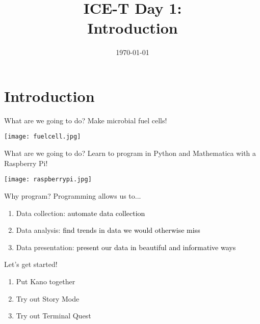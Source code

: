 \documentclass[xcolor=x11names,compress]{beamer}
\title[{\makebox[.5\paperwidth]{General Chemistry Recitation 1\hfill
       \insertframenumber/\inserttotalframenumber}}]{ICE-T Day 1:\\
Introduction}
\author[\quad Amanda \quad\quad\quad\quad aed63@pitt.edu]{}
\date{\small{\today}}
\renewcommand{\(}{\begin{columns}}
\renewcommand{\)}{\end{columns}}
\newcommand{\<}[1]{\begin{column}{#1}}
\renewcommand{\>}{\end{column}}
\begin{document}
\section{Introduction}
\begin{frame}
\titlepage
\end{frame}
\begin{frame}{What are we going to do?}
    Make microbial fuel cells!
    \begin{center}
        \texttt{[image: fuelcell.jpg]}
    \end{center}
\end{frame}
\begin{frame}{What are we going to do?}
    Learn to program in Python and Mathematica with a Raspberry Pi!
    \begin{center}
        \texttt{[image: raspberrypi.jpg]}
    \end{center}
\end{frame}
    \begin{frame}{Why program?}
Programming allows us to...
\begin{enumerate}[label=$\bullet$]
\item \textcolor{darkcoral}{Data collection: } \textcolor{black}{automate data collection}  \vspace{0.5cm} \pause
\item \textcolor{darkcoral}{Data analysis:} \textcolor{black}{find trends in data we would otherwise miss} \vspace{0.5cm} \pause
\item \textcolor{darkcoral}{Data presentation:} \textcolor{black}{present our data in beautiful and informative ways}
\end{enumerate}
\end{frame}

\begin{frame}{Let's get started!}
    \begin{enumerate}[label=$\bullet$]
        \item \textcolor{darkcoral}{Put Kano together} \vspace{0.5cm}
        \item \textcolor{darkcoral}{Try out Story Mode} \vspace{0.5cm}
        \item \textcolor{darkcoral}{Try out Terminal Quest}
    \end{enumerate}
\end{frame}
\end{document}
